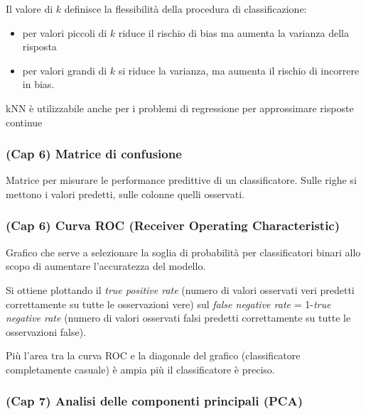 \documentclass[
]{article}
\begin{document}
Il valore di \(k\) definisce la flessibilità della procedura di
classificazione:

\begin{itemize}
\item
  per valori piccoli di \(k\) riduce il rischio di bias ma aumenta la
  varianza della risposta
\item
  per valori grandi di \(k\) si riduce la varianza, ma aumenta il
  rischio di incorrere in bias.
\end{itemize}

kNN è utilizzabile anche per i problemi di regressione per approssimare
risposte continue

\hypertarget{cap-6-matrice-di-confusione}{%
\subsubsection{(Cap 6) Matrice di
confusione}\label{cap-6-matrice-di-confusione}}

Matrice per misurare le performance predittive di un classificatore.
Sulle righe si mettono i valori predetti, sulle colonne quelli
osservati.

\hypertarget{cap-6-curva-roc-receiver-operating-characteristic}{%
\subsubsection{(Cap 6) Curva ROC (Receiver Operating
Characteristic)}\label{cap-6-curva-roc-receiver-operating-characteristic}}

Grafico che serve a selezionare la soglia di probabilità per
classificatori binari allo scopo di aumentare l'accuratezza del modello.

Si ottiene plottando il \emph{true positive rate} (numero di valori
osservati veri predetti correttamente su tutte le osservazioni vere) sul
\emph{false negative rate} = 1-\emph{true negative rate} (numero di
valori osservati falsi predetti correttamente su tutte le osservazioni
false).

Più l'area tra la curva ROC e la diagonale del grafico (classificatore
completamente casuale) è ampia più il classificatore è preciso.

\hypertarget{cap-7-analisi-delle-componenti-principali-pca}{%
\subsubsection{(Cap 7) Analisi delle componenti principali
(PCA)}\label{cap-7-analisi-delle-componenti-principali-pca}}
\end{document}
